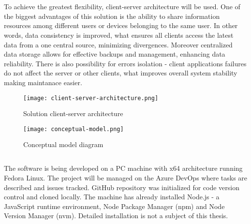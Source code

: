 \chapter{}%
\label{ch:poc}

\section{}%
\label{sec:design}
To achieve the greatest flexibility, client-server architecture will be used. One of the biggest advantages of this solution is the ability to share information resources among different users or devices belonging to the same user. In other words, data consistency is improved, what ensures all clients access the latest data from a one central source, minimizing divergences. Moreover centralized data storage allows for effective backups and management, enhancing data reliability. There is also possibility for errors isolation - client applications failures do not affect the server or other clients, what improves overall system stability making maintanace easier.

\begin{figure}[H]
    \centering
    \texttt{[image: client-server-architecture.png]}
    \caption[Layout]{\label{fig:architecture} Solution client-server architecture }
\end{figure}

\begin{figure}[H]
    \centering
    \texttt{[image: conceptual-model.png]}
    \caption[Layout]{\label{fig:conceptualmodel} Conceptual model diagram }
\end{figure}


\section{}%
\label{sec:prerequisites}

The software is being developed on a PC machine with x64 architecture running Fedora Linux. The project  will be managed on the Azure DevOps where tasks are described and issues tracked. GitHub repository was initialized for code version control and cloned locally. The machine has already installed Node.js - a JavaScript runtime environment, Node Package Manager (npm) and Node Version Manager (nvm). Detailed installation is not a subject of this thesis.

